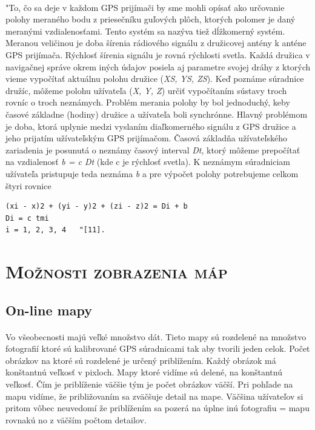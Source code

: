 \paragraph{}
"To, čo sa deje v každom GPS prijímači by sme mohli opísať ako určovanie polohy
meraného bodu z priesečníku guľových plôch, ktorých polomer je daný meranými
vzdialenosťami. Tento systém sa nazýva tiež dĺžkomerný systém. Meranou veličinou
je doba šírenia rádiového signálu z družicovej antény k anténe GPS prijímača. Rýchlosť šírenia signálu je rovná rýchlosti svetla. Každá družica v
navigačnej správe okrem iných údajov posiela aj parametre svojej dráhy
z ktorých vieme vypočítať aktuálnu polohu družice (\textit{XS, YS, ZS}). Keď
poznáme súradnice družíc, môžeme polohu užívateľa (\textit{X, Y, Z}) určiť vypočítaním
sústavy troch rovníc o troch neznámych. Problém merania polohy by bol
jednoduchý, keby časové základne (hodiny) družice a užívateľa boli synchrónne.
Hlavný problémom je doba, ktorá uplynie medzi vyslaním diaľkomerného signálu z
GPS družice a jeho prijatím užívateľským GPS prijímačom. Časová základňa
užívateľského zariadenia je posunutá o neznámy časový interval \textit{Dt}, ktorý môžeme
prepočítať na vzdialenosť \textit{b = c Dt} (kde c je rýchlosť svetla). K neznámym
súradniciam užívateľa pristupuje teda neznáma \textit{b} a pre výpočet polohy potrebujeme
celkom štyri rovnice

\begin{verbatim}
(xi - x)2 + (yi - y)2 + (zi - z)2 = Di + b
Di = c tmi
i = 1, 2, 3, 4   "[11].
\end{verbatim}

\section{\textsc{Možnosti zobrazenia máp}}
\subsection{On-line mapy} 
\paragraph{}
Vo všeobecnosti majú veľké množstvo dát. Tieto mapy sú rozdelené na
množstvo fotografií ktoré sú kalibrované GPS súradnicami tak aby tvorili jeden
celok. Počet obrázkov na ktoré sú rozdelené je určený priblížením. Každý obrázok
má konštantnú veľkosť v pixloch. Mapy ktoré vidíme sú delené, na konštantnú
veľkosť. Čím je priblíženie väčšie tým je počet obrázkov väčší. Pri
pohľade na mapu vidíme, že približovaním sa zväčšuje detail na mape. Väčšina
užívateľov si pritom vôbec neuvedomí že priblížením sa pozerá na úplne inú
fotografiu = mapu rovnakú no z väčším počtom detailov. 
